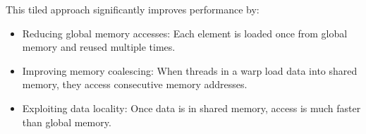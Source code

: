 This tiled approach significantly improves performance by:

\begin{itemize}
    \item Reducing global memory accesses: Each element is loaded once from global memory and reused multiple times.
    
    \item Improving memory coalescing: When threads in a warp load data into shared memory, they access consecutive memory addresses.
    
    \item Exploiting data locality: Once data is in shared memory, access is much faster than global memory.
\end{itemize}

